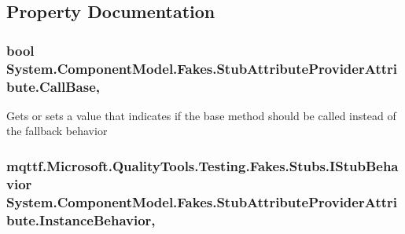 \subsection{Property Documentation}
\hypertarget{class_system_1_1_component_model_1_1_fakes_1_1_stub_attribute_provider_attribute_a50a5958bcc82000e9a99d1420bd2842e}{
\subsubsection[{Call\-Base}]{\setlength{\rightskip}{0pt plus 5cm}bool System.\-Component\-Model.\-Fakes.\-Stub\-Attribute\-Provider\-Attribute.\-Call\-Base\hspace{0.3cm}{\ttfamily [get]}, {\ttfamily [set]}}}\label{class_system_1_1_component_model_1_1_fakes_1_1_stub_attribute_provider_attribute_a50a5958bcc82000e9a99d1420bd2842e}


Gets or sets a value that indicates if the base method should be called instead of the fallback behavior

\hypertarget{class_system_1_1_component_model_1_1_fakes_1_1_stub_attribute_provider_attribute_adb6fb57fa15b3b1a05b3d50e341c792c}{
\subsubsection[{Instance\-Behavior}]{\setlength{\rightskip}{0pt plus 5cm}mqttf.\-Microsoft.\-Quality\-Tools.\-Testing.\-Fakes.\-Stubs.\-I\-Stub\-Behavior System.\-Component\-Model.\-Fakes.\-Stub\-Attribute\-Provider\-Attribute.\-Instance\-Behavior\hspace{0.3cm}{\ttfamily [get]}, {\ttfamily [set]}}}\label{class_system_1_1_component_model_1_1_fakes_1_1_stub_attribute_provider_attribute_adb6fb57fa15b3b1a05b3d50e341c792c}


